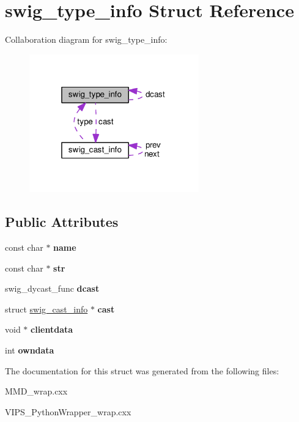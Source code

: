 \hypertarget{structswig__type__info}{}\section{swig\+\_\+type\+\_\+info Struct Reference}
\label{structswig__type__info}


Collaboration diagram for swig\+\_\+type\+\_\+info\+:
\nopagebreak
\begin{figure}[H]
\begin{center}
\leavevmode
\includegraphics[width=208pt]{structswig__type__info__coll__graph}
\end{center}
\end{figure}
\subsection*{Public Attributes}
\begin{DoxyCompactItemize}
\item 
const char $\ast$ {\bfseries name}\hypertarget{structswig__type__info_aa6c9f9ed3037043b6d346162cf932daf}{}\label{structswig__type__info_aa6c9f9ed3037043b6d346162cf932daf}

\item 
const char $\ast$ {\bfseries str}\hypertarget{structswig__type__info_aaafd19f362ddc521d6a846ce41044471}{}\label{structswig__type__info_aaafd19f362ddc521d6a846ce41044471}

\item 
swig\+\_\+dycast\+\_\+func {\bfseries dcast}\hypertarget{structswig__type__info_a07df4bedf85be77b23756b531b60e0dd}{}\label{structswig__type__info_a07df4bedf85be77b23756b531b60e0dd}

\item 
struct \hyperlink{structswig__cast__info}{swig\+\_\+cast\+\_\+info} $\ast$ {\bfseries cast}\hypertarget{structswig__type__info_ae535f16234db99893f07880cb94a848e}{}\label{structswig__type__info_ae535f16234db99893f07880cb94a848e}

\item 
void $\ast$ {\bfseries clientdata}\hypertarget{structswig__type__info_a2e1f9087e639dd7c8c131fbc6e399194}{}\label{structswig__type__info_a2e1f9087e639dd7c8c131fbc6e399194}

\item 
int {\bfseries owndata}\hypertarget{structswig__type__info_a93c25d5903cbfcb82208eea7227c32bd}{}\label{structswig__type__info_a93c25d5903cbfcb82208eea7227c32bd}

\end{DoxyCompactItemize}


The documentation for this struct was generated from the following files\+:\begin{DoxyCompactItemize}
\item 
M\+M\+D\+\_\+wrap.\+cxx\item 
V\+I\+P\+S\+\_\+\+Python\+Wrapper\+\_\+wrap.\+cxx\end{DoxyCompactItemize}

